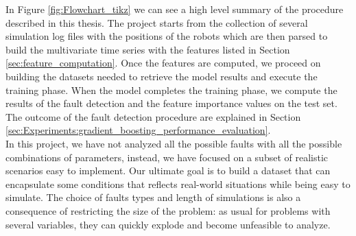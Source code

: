 \documentclass[../../Thesis.tex]{subfiles}
\begin{document}
		In Figure \ref{fig:Flowchart_tikz} we can see a high level summary of the procedure described in this thesis. The project starts from the collection of several simulation log files with the positions of the robots which are then parsed to build the multivariate time series with the features listed in Section \ref{sec:feature_computation}. Once the features are computed, we proceed on building the datasets needed to retrieve the model results and execute the training phase. When the model completes the training phase, we compute the results of the fault detection and the feature importance values on the test set.  The outcome of the fault detection procedure are explained in Section \ref{sec:Experiments:gradient_boosting_performance_evaluation}.\\
		In this project, we have not analyzed all the possible faults with all the possible combinations of parameters, instead, we have focused on a subset of realistic scenarios easy to implement. Our ultimate goal is to build a dataset that can encapsulate some conditions that reflects real-world situations while being easy to simulate. The choice of faults types and length of simulations is also a consequence of restricting the size of the problem: as usual for problems with several variables, they can quickly explode and become unfeasible to analyze.
\end{document}
